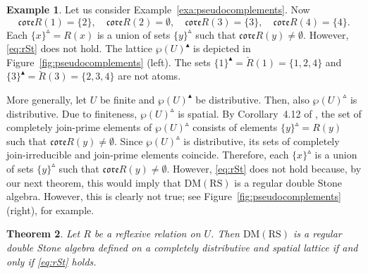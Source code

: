 \documentclass[11pt,a4paper]{amsart}
\newcommand{\UP}{\blacktriangle}
\newcommand{\Up}{\vartriangle}
\theoremstyle{plain}
\newtheorem{theorem}{Theorem}[section]
\theoremstyle{definition}
\newtheorem{example}[theorem]{Example}
\theoremstyle{remark}
\numberwithin{equation}{section}
\begin{document}
\begin{example} \label{ex:disprove}
Let us consider Example~\ref{exa:pseudocomplements}. Now
\[ 
\mathfrak{core}R(1) = \{2\}, \quad
\mathfrak{core}R(2) = \emptyset, \quad
\mathfrak{core}R(3) = \{3\}, \quad
\mathfrak{core}R(4) = \{4\}.
\]
Each $\{x\}^\Up = R(x)$ is a union of sets $\{y\}^\Up$ such that
$\mathfrak{core}R(y) \neq \emptyset$. However, \eqref{eq:rSt} does not hold.
The lattice $\wp(U)^\UP$ is depicted in Figure~\ref{fig:pseudocomplements} (left).
The sets $\{1\}^\UP = \breve{R}(1) = \{1,2,4\}$ and  
$\{3\}^\UP = \breve{R}(3) = \{2,3,4\}$ are not atoms.

More generally, let $U$ be finite and $\wp(U)^\UP$ be distributive.
Then, also $\wp(U)^\Up$ is distributive. Due to finiteness,
$\wp(U)^\Up$ is spatial. By Corollary~{4.12} of \cite{JarRad25}, the set of
completely join-prime elements of $\wp(U)^\Up$ consists of elements
$\{y\}^\Up = R(y)$ such that $\mathfrak{core}R(y) \neq \emptyset$.
Since $\wp(U)^\Up$ is distributive, its sets of completely join-irreducible
and join-prime elements coincide. Therefore, each $\{x\}^\Up$ is a union of sets
$\{y\}^\Up$ such that $\mathfrak{core}R(y) \neq \emptyset$.
However, \eqref{eq:rSt} does not hold because, by our next theorem, this would imply
that $\mathrm{DM(RS)}$ is a regular double Stone algebra. However, this is
clearly not true; see Figure~\ref{fig:pseudocomplements} (right),
for example.
\end{example}

\begin{theorem}
\label{thm:regular_double_stone}
Let $R$ be a reflexive relation on $U$. Then 
$\mathrm{DM(RS)}$  is a regular double Stone algebra
defined on a completely distributive and spatial lattice 
if and only if \eqref{eq:rSt} holds.
\end{theorem} 
\end{document}
